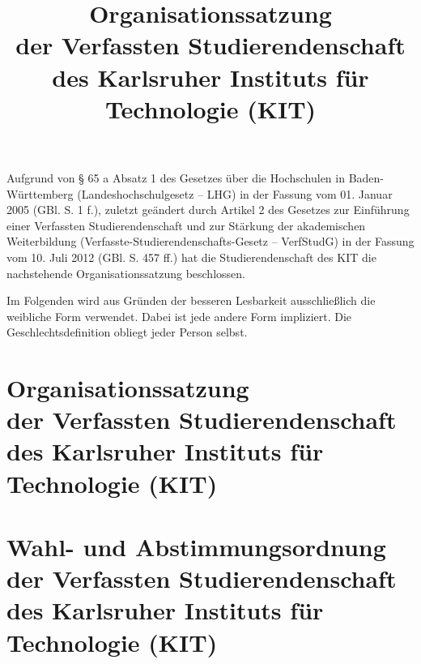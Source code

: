 \documentclass[
	a4paper,
	parskip=half,
	numbers=noenddot,
	titlepage,
	twoside,
	BCOR=2mm,
	DIV=12,
]{scrartcl}
\title{Organisationssatzung \\ der Verfassten Studierendenschaft \\ des Karlsruher Instituts für Technologie (KIT)}
\author{}
\date{}
\begin{document}
\maketitle

\cleardoublepage

\begin{multicols}{2}
\tableofcontents
\end{multicols}

\bigskip

Aufgrund von § 65 a Absatz 1 des Gesetzes über die Hochschulen in Baden-Württemberg (Landeshochschulgesetz -- LHG) in der Fassung vom 01. Januar 2005 (GBl. S. 1 f.), zuletzt geändert durch Artikel 2 des Gesetzes zur Einführung einer Verfassten Studierendenschaft und zur Stärkung der akademischen Weiterbildung (Verfasste-Studierendenschafts-Gesetz -- VerfStudG) in der Fassung vom 10. Juli 2012 (GBl. S. 457 ff.) hat die Studierendenschaft des KIT die nachstehende Organisationssatzung beschlossen.

Im Folgenden wird aus Gründen der besseren Lesbarkeit ausschließlich die weibliche Form verwendet. Dabei ist jede andere Form impliziert. Die Geschlechtsdefinition obliegt jeder Person selbst.




\part[Organisationssatzung]{Organisationssatzung \\ der Verfassten Studierendenschaft \\ des Karlsruher Instituts für Technologie (KIT)}

\begin{multicols}{2}

\end{multicols}


\part[Wahl- und Abstimmungsordnung]{Wahl- und Abstimmungsordnung \\ der Verfassten Studierendenschaft \\ des Karlsruher Instituts für Technologie (KIT)}

\begin{multicols}{2}

\end{multicols}
\end{document}

